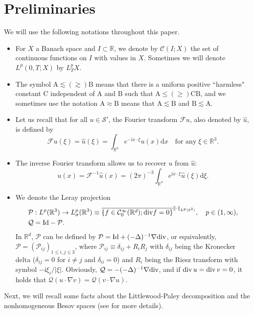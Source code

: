 \documentclass[12pt]{article}
\newcommand{\bbal}{\begin{align*}}
\def\div{\mathord{{\rm div}}}
\newcommand{\na}{\nabla}
\newcommand{\cd}{\cdot}
\newcommand{\dd}{\mathrm{d}}
\newcommand{\R}{\mathbb{R}}
\begin{document}
\section{Preliminaries}\label{sec2}
We will use the following notations throughout this paper.
\begin{itemize}
  \item For $X$ a Banach space and $I\subset\R$, we denote by $\mathcal{C}(I;X)$ the set of continuous functions on $I$ with values in $X$. Sometimes we will denote $L^p(0,T;X)$ by $L_T^pX$.
  \item The symbol $\mathrm{A}\lesssim (\gtrsim)\mathrm{B}$ means that there is a uniform positive ``harmless" constant $\mathrm{C}$ independent of $\mathrm{A}$ and $\mathrm{B}$ such that $\mathrm{A}\leq(\geq) \mathrm{C}\mathrm{B}$, and we sometimes use the notation $\mathrm{A}\approx \mathrm{B}$ means that $\mathrm{A}\lesssim \mathrm{B}$ and $\mathrm{B}\lesssim \mathrm{A}$.
  \item Let us recall that for all $u\in \mathcal{S}'$, the Fourier transform $\mathcal{F}u$, also denoted by $\widehat{u}$, is defined by
$$
\mathcal{F}u(\xi)=\widehat{u}(\xi)=\int_{\R^3}e^{-\mathrm{i}x\cd \xi}u(x)\dd x \quad\text{for any}\; \xi\in\R^3.
$$
  \item The inverse Fourier transform allows us to recover $u$ from $\widehat{u}$:
$$
u(x)=\mathcal{F}^{-1}\widehat{u}(x)=(2\pi)^{-3}\int_{\R^3}e^{\mathrm{i}x\cdot\xi}\widehat{u}(\xi)\dd\xi.
$$
 \item We denote the Leray projection
\bbal
&\mathcal{P}: L^{p}(\mathbb{R}^{3}) \rightarrow L_{\sigma}^{p}(\mathbb{R}^{3}) \equiv \overline{\left\{f \in \mathcal{C}^\infty_{0}(\mathbb{R}^{d}) ; {\rm{div}} f=0\right\}}^{\|\cdot\|_{L^{p}(\mathbb{R}^{3})}},\quad p\in(1,\infty),\\
&\mathcal{Q}=\mathrm{Id}-\mathcal{P}.
\end{align*}
In $\mathbb{R}^{d}$, $\mathcal{P}$ can be defined by $\mathcal{P}= \mathrm{Id}+(-\Delta)^{-1}\nabla {\rm{div}}$, or equivalently, $\mathcal{P}=(\mathcal{P}_{i j})_{1 \leqslant i, j \leqslant 3}$, where $\mathcal{P}_{i j} \equiv \delta_{i j}+R_{i} R_{j}$ with $\delta_{i j}$ being the Kronecker delta ($\delta_{i j}=0$ for $i\neq j$ and $\delta_{i i}=0$) and $R_{i}$ being the Riesz transform with symbol $-\mathrm{i}\xi_i/|\xi|$. Obviously, $\mathcal{Q}= -(-\Delta)^{-1}\nabla {\rm{div}}$, and if $\div\, u=\div\, v=0$, it holds that
$
\mathcal{Q}(u\cdot\na v)= \mathcal{Q}(v\cdot\na u).
$
\end{itemize}
Next, we will recall some facts about the Littlewood-Paley decomposition and the nonhomogeneous Besov spaces (see \cite{B} for more details).
\end{document}
